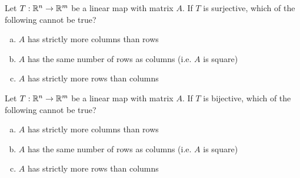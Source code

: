 \begin{applicationActivities}{2}{22}
\begin{activity}{5}
Let $T: \mathbb{R}^n \rightarrow \mathbb{R}^m$ be a linear map with matrix $A$.
If $T$ is surjective, which of the following cannot be true?
\begin{enumerate}[(a)]
\item $A$ has strictly more columns than rows
\item $A$ has the same number of rows as columns (i.e. $A$ is square)
\item $A$ has strictly more rows than columns
\end{enumerate}
\end{activity}

\begin{activity}{5}
Let $T: \mathbb{R}^n \rightarrow \mathbb{R}^m$ be a linear map with matrix $A$.
If $T$ is bijective, which of the following cannot be true?
\begin{enumerate}[(a)]
\item $A$ has strictly more columns than rows
\item $A$ has the same number of rows as columns (i.e. $A$ is square)
\item $A$ has strictly more rows than columns
\end{enumerate}
\end{activity}

\end{applicationActivities}
